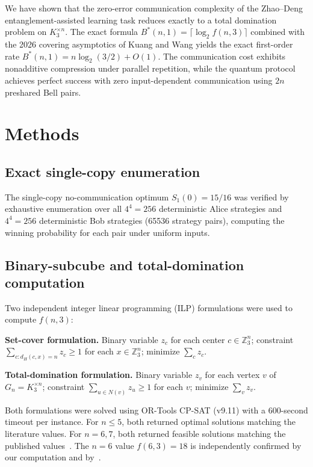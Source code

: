 \documentclass[11pt,letterpaper]{article}
\newcommand{\Z}{\mathbb{Z}}
\newcommand{\Bstar}{B^{\!*}}
\begin{document}
We have shown that the zero-error communication complexity of the Zhao--Deng entanglement-assisted learning task reduces exactly to a total domination problem on $K_3^{\times n}$. The exact formula $\Bstar(n,1) = \lceil \log_2 f(n,3) \rceil$ combined with the 2026 covering asymptotics of Kuang and Wang yields the exact first-order rate $\Bstar(n,1) = n\log_2(3/2) + O(1)$. The communication cost exhibits nonadditive compression under parallel repetition, while the quantum protocol achieves perfect success with zero input-dependent communication using $2n$ preshared Bell pairs.

\section{Methods}
\label{sec:methods}

\subsection{Exact single-copy enumeration}

The single-copy no-communication optimum $S_1(0) = 15/16$ was verified by exhaustive enumeration over all $4^4 = 256$ deterministic Alice strategies and $4^4 = 256$ deterministic Bob strategies (65536 strategy pairs), computing the winning probability for each pair under uniform inputs.

\subsection{Binary-subcube and total-domination computation}

Two independent integer linear programming (ILP) formulations were used to compute $f(n,3)$:

\textbf{Set-cover formulation.} Binary variable $z_c$ for each center $c \in \Z_3^n$; constraint $\sum_{c : d_H(c,x)=n} z_c \geq 1$ for each $x \in \Z_3^n$; minimize $\sum_c z_c$.

\textbf{Total-domination formulation.} Binary variable $z_v$ for each vertex $v$ of $G_n = K_3^{\times n}$; constraint $\sum_{u \in N(v)} z_u \geq 1$ for each $v$; minimize $\sum_v z_v$.

Both formulations were solved using OR-Tools CP-SAT (v9.11) with a 600-second timeout per instance. For $n \leq 5$, both returned optimal solutions matching the literature values. For $n = 6, 7$, both returned feasible solutions matching the published values~\cite{adriaensen2026}. The $n=6$ value $f(6,3)=18$ is independently confirmed by our computation and by~\cite{adriaensen2026}.
\end{document}
